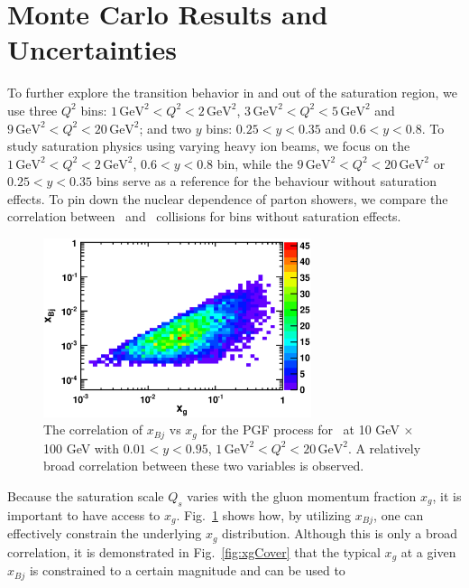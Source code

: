 \section{Monte Carlo Results and Uncertainties} 
 To further explore the
transition behavior in and out of the saturation region, we use three $Q^{2}$ bins:
$1\, \textrm{GeV}^{2}<Q^{2}<2 \, \mathrm{GeV}^{2}$, $3\, \textrm{GeV}^{2}<Q^{2}<5 \,
\mathrm{GeV}^{2}$ and $9\, \textrm{GeV}^{2}<Q^{2}<20 \, \mathrm{GeV}^{2}$; and two $y$ bins:
$0.25<y<0.35$ and $0.6<y<0.8$. To study saturation physics using varying heavy
ion beams, we focus on the $1\, \textrm{GeV}^{2}<Q^{2}<2 \, \mathrm{GeV}^{2}$, $0.6<y<0.8$
bin, while the $9\, \textrm{GeV}^{2}<Q^{2}<20 \, \mathrm{GeV}^{2}$ or $0.25<y<0.35$ bins serve
as a reference for the behaviour without saturation effects. To pin down the
nuclear dependence of parton showers, we compare the correlation between \ep\
and \eA\ collisions for bins without saturation effects.
\begin{figure}
\begin{center}
\includegraphics[width=0.7\textwidth]{plots/chpt6/xbjVsxg_highPtPairs_PGF_10x100.eps}
\end{center}
\caption[Correlation of $x_g$ and $x_{Bj}$]{The correlation of $x_{Bj}$ vs $x_{g}$ for the PGF process for \ep\ at 
10 GeV $\times$ 100 GeV with $0.01<y<0.95$, $1\, \textrm{GeV}^{2}<Q^{2}<20 \, \mathrm{GeV^{2}}$. A relatively 
broad correlation between these two variables is observed. }
\label{fig:xbjVsxg}
\end{figure}
Because the saturation scale $Q_{s}$ varies with the gluon momentum fraction
$x_{g}$, it is important to have access to $x_{g}$.
Fig.~\ref{fig:xbjVsxg} shows how, by utilizing $x_{Bj}$, one can
effectively constrain the underlying $x_{g}$ distribution. Although this is only
a broad correlation, it is demonstrated in Fig.~\ref{fig:xgCover} that
the typical $x_{g}$ at a given $x_{Bj}$ is constrained to a certain magnitude and can be used to
